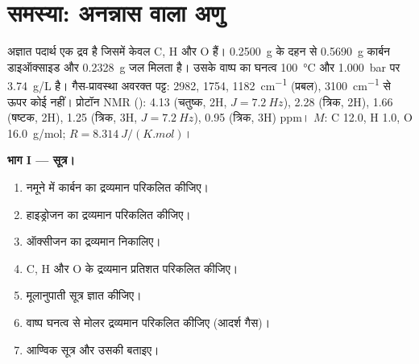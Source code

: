 \section{समस्या: अनन्नास वाला अणु}

\begin{problem}
\label{pb:b1:structure-spectroscopy:1}
अज्ञात पदार्थ एक द्रव है जिसमें केवल C, H और O हैं।
\qty{0.2500}{g} के दहन से \qty{0.5690}{g} कार्बन डाइऑक्साइड और
\qty{0.2328}{g} जल मिलता है। उसके वाष्प का घनत्व \qty{100}{\celsius} और
\qty{1.000}{bar} पर \qty{3.74}{g/L} है। गैस-प्रावस्था अवरक्त पट्ट: 2982,
1754, \qty{1182}{cm^{-1}} (प्रबल), \qty{3100}{cm^{-1}} से ऊपर
कोई नहीं। प्रोटॉन NMR (): 4.13 (चतुष्क, 2H, $J = \qty{7.2}{Hz}$),
2.28 (त्रिक, 2H), 1.66 (षष्टक, 2H), 1.25 (त्रिक, 3H, $J = \qty{7.2}{Hz}$), 0.95
(त्रिक, 3H) ppm। $M$: C 12.0, H 1.0, O \qty{16.0}{g/mol}; $R =
\qty{8.314}{J/(K.mol)}$।

\begin{center}
\end{center}

\medskip
\noindent\textbf{भाग I --- सूत्र।}
\begin{enumerate}
  \item नमूने में कार्बन का द्रव्यमान परिकलित कीजिए।
  \item हाइड्रोजन का द्रव्यमान परिकलित कीजिए।
  \item ऑक्सीजन का द्रव्यमान निकालिए।
  \item C, H और O के द्रव्यमान प्रतिशत परिकलित कीजिए।
  \item मूलानुपाती सूत्र ज्ञात कीजिए।
  \item वाष्प घनत्व से मोलर द्रव्यमान परिकलित कीजिए (आदर्श गैस)।
  \item आण्विक सूत्र और उसकी  बताइए।
\end{enumerate}


\end{problem}
